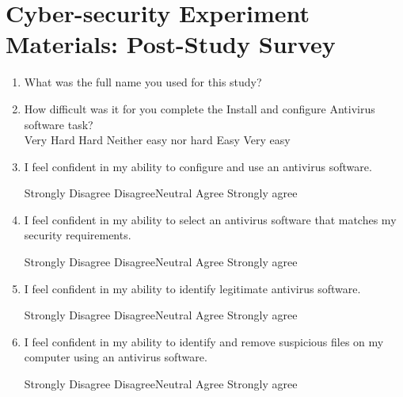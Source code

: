 \documentclass[doctor]{thesis} %
\theoremstyle{plain}
\begin{document}
\chapter{Cyber-security Experiment Materials: Post-Study Survey}
\label{apx:cypost}
\begin{enumerate}[noitemsep]
\item What was the full name you used for this study?
\item How difficult was it for you complete the Install and configure Antivirus software task?\\
Very Hard \hspace{1cm} Hard \hspace{1cm} Neither easy nor hard \hspace{1cm} Easy \hspace{1cm} Very easy 
\item I feel confident in my ability to configure and use an antivirus software.
\par Strongly Disagree \hspace{1cm} Disagree\hspace{1cm}Neutral\hspace{1cm} Agree\hspace{1cm} Strongly agree
\item I feel confident in my ability to select an antivirus software that matches my security requirements.
\par Strongly Disagree \hspace{1cm} Disagree\hspace{1cm}Neutral\hspace{1cm} Agree\hspace{1cm} Strongly agree
\item I feel confident in my ability to identify legitimate antivirus software.
\par Strongly Disagree \hspace{1cm} Disagree\hspace{1cm}Neutral\hspace{1cm} Agree\hspace{1cm} Strongly agree
\item I feel confident in my ability to identify and remove suspicious files on my computer using an antivirus software.
\par Strongly Disagree \hspace{1cm} Disagree\hspace{1cm}Neutral\hspace{1cm} Agree\hspace{1cm} Strongly agree

\end{enumerate}
\end{document}
